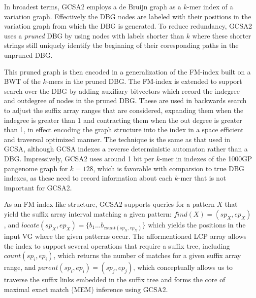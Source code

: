 In broadest terms, GCSA2 employs a de Bruijn graph as a $k$-mer index of a variation graph.
Effectively the DBG nodes are labeled with their positions in the variation graph from which the DBG is generated.
To reduce redundancy, GCSA2 uses a \emph{pruned} DBG by using nodes with labels shorter than $k$ where these shorter strings still uniquely identify the beginning of their coresponding paths in the unpruned DBG.

This pruned graph is then encoded in a generalization of the FM-index built on a BWT of the $k$-mers in the pruned DBG.
The FM-index is extended to support search over the DBG by adding auxiliary bitvectors which record the indegree and outdegree of nodes in the pruned DBG.
These are used in backwards search to adjust the suffix array ranges that are considered, expanding them when the indegree is greater than 1 and contracting them when the out degree is greater than 1, in effect encoding the graph structure into the index in a space efficient and traversal optimized manner.
The technique is the same as that used in GCSA, although GCSA indexes a reverse deterministic automaton rather than a DBG.
Impressively, GCSA2 uses around 1 bit per $k$-mer in indexes of the 1000GP pangenome graph for $k=128$, which is favorable with comparsion to true DBG indexes, as these need to record information about each $k$-mer that is not important for GCSA2.

As an FM-index like structure, GCSA2 supports queries for a pattern $X$ that yield the suffix array interval matching a given pattern: $find(X) = ( sp_{X}, ep_{X} )$, and $locate( sp_{X}, ep_{X} ) = \{ b_1 \ldots b_{count(sp_{X}, ep_{X})} \}$ which yields the positions in the input VG where the given patterns occur.
The afformentioned LCP array allows the index to support several operations that require a suffix tree, including $count(sp_i, ep_i)$, which returns the number of matches for a given suffix array range, and $parent(sp_i, ep_i) = (sp_j, ep_j)$, which conceptually allows us to traverse the suffix links embedded in the suffix tree and forms the core of maximal exact match (MEM) inference using GCSA2.

